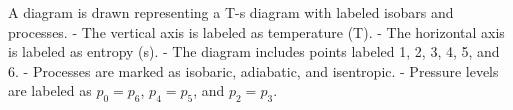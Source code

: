 A diagram is drawn representing a T-s diagram with labeled isobars and processes.  
- The vertical axis is labeled as temperature (T).  
- The horizontal axis is labeled as entropy (s).  
- The diagram includes points labeled 1, 2, 3, 4, 5, and 6.  
- Processes are marked as isobaric, adiabatic, and isentropic.  
- Pressure levels are labeled as \( p_0 = p_6 \), \( p_4 = p_5 \), and \( p_2 = p_3 \).